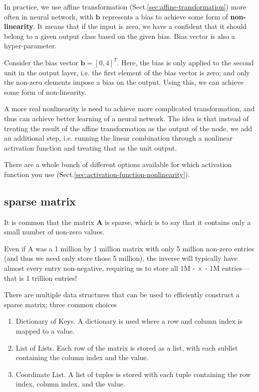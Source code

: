 In practice, we use affine transformation (Sect.\ref{sec:affine-transformation})
more often in neural network, with $\mathbf{b}$ represents a bias to achieve
some form of {\bf non-linearity}. It means that if the input is zero, we have a
confident that it should belong to a given output class based on the given bias.
Bias vector is also a hyper-parameter.

Consider the bias vector $\mathbf{b} = [0, 4]^T$. Here, the bias is only applied
to the second unit in the output layer, i.e.
the first element of the bias vector is zero; and only the non-zero elements
impose a bias on the output. Using this, we can achieve some form of
non-linearity.

A more real nonlinearity is need to achieve more complicated transformation, and
thus can achieve better learning of a neural network. The idea is that instead
of treating the result of the affine transformation as the output of the node,
we add an additional step, i.e. running the linear combination through a
nonlinear activation function and treating that as the unit output.

There are a whole bunch of different options available for which activation
function you use (Sect.\ref{sec:activation-function-nonlinearity}).

\subsection{sparse matrix}
\label{sec:math-sparse-matrix}

It is common that the matrix $\mathbf{A}$ is sparse, which is to say that it
contains only a small number of non-zero values.

Even if A was a 1 million by 1 million matrix with only 5 million non-zero
entries (and thus we need only store those 5 million), the inverse will
typically have almost every entry non-negative, requiring us to store all 1M -
$\times$ -  1M  entries—that is 1 trillion entries!


There are multiple data structures that can be used to efficiently construct a sparse matrix; three common choices
\begin{enumerate}
  \item  Dictionary of Keys. A dictionary is used where a row and column index is mapped to a value.
  
  \item List of Lists. Each row of the matrix is stored as a list, with each sublist containing the column index and the value.
 
  
  \item Coordinate List. A list of tuples is stored with each tuple containing the row index, column index, and the value.
\end{enumerate}

